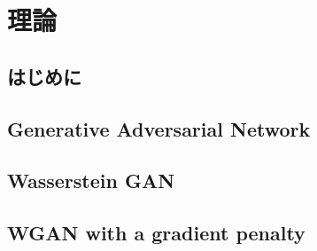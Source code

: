 \documentclass[\homedir/main.tex]{subfiles}
\begin{document}
\setcounter{chapter}{2}
\chapter{理論}\label{sec:theories}
\section{はじめに}

\section{Generative Adversarial Network}

\section{Wasserstein GAN}

\section{WGAN with a gradient penalty}
\end{document}
